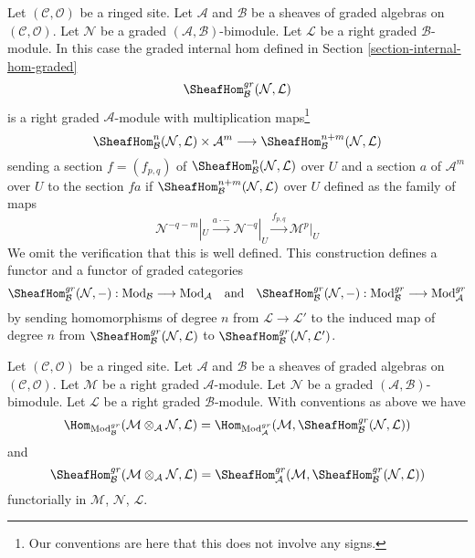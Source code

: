 \medskip\noindent
Let $(\mathcal{C}, \mathcal{O})$ be a ringed site. Let $\mathcal{A}$
and $\mathcal{B}$ be a sheaves of graded algebras on
$(\mathcal{C}, \mathcal{O})$. Let $\mathcal{N}$ be a
graded $(\mathcal{A}, \mathcal{B})$-bimodule. Let 
$\mathcal{L}$ be a right graded $\mathcal{B}$-module.
In this case the graded internal hom
defined in Section \ref{section-internal-hom-graded}
$$
\SheafHom_\mathcal{B}^{gr}(\mathcal{N}, \mathcal{L})
$$
is a right graded $\mathcal{A}$-module with
multiplication maps\footnote{Our conventions are here
that this does not involve any signs.}
$$
\SheafHom^n_\mathcal{B}(\mathcal{N}, \mathcal{L})
\times \mathcal{A}^m
\longrightarrow
\SheafHom^{n + m}_\mathcal{B}(\mathcal{N}, \mathcal{L})
$$
sending a section $f = (f_{p,q})$ of
$\SheafHom^n_\mathcal{B}(\mathcal{N}, \mathcal{L})$ over $U$
and a section $a$ of $\mathcal{A}^m$ over $U$ to the section
$f a$ if $\SheafHom^{n + m}_\mathcal{B}(\mathcal{N}, \mathcal{L})$ over $U$
defined as the family of maps
$$
\mathcal{N}^{-q - m}|_U \xrightarrow{a \cdot -}
\mathcal{N}^{-q}|_U \xrightarrow{f_{p, q}}
\mathcal{M}^p|_U
$$
We omit the verification that this is well defined. This construction
defines a functor and a functor of graded categories
$$
\SheafHom_\mathcal{B}^{gr}(\mathcal{N}, -) :
\text{Mod}_\mathcal{B}
\longrightarrow
\text{Mod}_\mathcal{A}
\quad\text{and}\quad
\SheafHom_\mathcal{B}^{gr}(\mathcal{N}, -) :
\text{Mod}^{gr}_\mathcal{B}
\longrightarrow
\text{Mod}^{gr}_\mathcal{A}
$$
by sending homomorphisms of degree $n$ from $\mathcal{L} \to \mathcal{L}'$
to the induced map of degree $n$ from
$\SheafHom_\mathcal{B}^{gr}(\mathcal{N}, \mathcal{L})$ to
$\SheafHom_\mathcal{B}^{gr}(\mathcal{N}, \mathcal{L}')$.

\begin{lemma}
\label{lemma-tensor-hom-adjunction-gr}
Let $(\mathcal{C}, \mathcal{O})$ be a ringed site. Let $\mathcal{A}$
and $\mathcal{B}$ be a sheaves of graded algebras on
$(\mathcal{C}, \mathcal{O})$. Let $\mathcal{M}$ be a right
graded $\mathcal{A}$-module. Let $\mathcal{N}$ be a
graded $(\mathcal{A}, \mathcal{B})$-bimodule. Let $\mathcal{L}$
be a right graded $\mathcal{B}$-module. With conventions as above
we have
$$
\Hom_{\text{Mod}_\mathcal{B}^{gr}}(
\mathcal{M} \otimes_\mathcal{A} \mathcal{N}, \mathcal{L}) =
\Hom_{\text{Mod}_\mathcal{A}^{gr}}(
\mathcal{M}, \SheafHom_\mathcal{B}^{gr}(\mathcal{N}, \mathcal{L}))
$$
and
$$
\SheafHom_\mathcal{B}^{gr}(
\mathcal{M} \otimes_\mathcal{A} \mathcal{N}, \mathcal{L}) =
\SheafHom_\mathcal{A}^{gr}(
\mathcal{M}, \SheafHom_\mathcal{B}^{gr}(\mathcal{N}, \mathcal{L}))
$$
functorially in $\mathcal{M}$, $\mathcal{N}$, $\mathcal{L}$.
\end{lemma}


